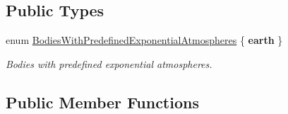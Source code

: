 \subsection*{Public Types}
\begin{DoxyCompactItemize}
\item 
enum \hyperlink{classtudat_1_1aerodynamics_1_1ExponentialAtmosphere_a86631e9491185c2c0b8681acf2a13016}{Bodies\+With\+Predefined\+Exponential\+Atmospheres} \{ {\bfseries earth}
 \}\begin{DoxyCompactList}\small\item\em Bodies with predefined exponential atmospheres. \end{DoxyCompactList}
\end{DoxyCompactItemize}
\subsection*{Public Member Functions}
